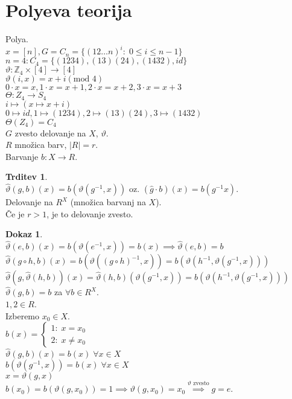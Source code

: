 \documentclass[a4paper, 12pt]{book}
\theoremstyle{definition}
\newtheorem{claim}[counter]{Trditev}
\newtheorem{pro}[counter]{Dokaz}
\theoremstyle{remark}
\newcommand{\Z}{\mathbb{Z}}
\begin{document}
\section{Polyeva teorija}

Polya. \\
$x = [n], G = C_n = \{(1 2 \dots n)^i: \; 0 \leq i \leq n-1\}$ \\
$n = 4: C_4 = \{(1 2 3 4), (1 3) (2 4), (1 4 3 2), id\}$ \\
$\vartheta: \Z_4 \times [4] \to [4]$ \\
$\vartheta(i, x) = x + i (\text{mod } 4)$ \\
$0 \cdot x = x, 1 \cdot x = x+1, 2 \cdot x = x+2, 3 \cdot x = x+3$ \\
$\Theta: Z_4 \to S_4$ \\
$i \mapsto (x \mapsto x+i)$ \\
$0 \mapsto id, 1 \mapsto (1 2 3 4), 2 \mapsto (1 3) (2 4), 3 \mapsto (1 4 3 2)$ \\
$\Theta(Z_4) = C_4$ \\
$G$ zvesto delovanje na $X$, $\vartheta$. \\
$R$ množica barv, $|R| = r$. \\
Barvanje $b: X \to R$.
\begin{claim} \text{} \\
  $\widehat{\vartheta}(g,b)(x) = b(\vartheta(g^{-1}, x))$ oz. $(\hat{g} \cdot b)(x) = b(g^{-1} x)$. \\
  Delovanje na $R^X$ (množica barvanj na $X$). \\
  Če je $r > 1$, je to delovanje zvesto. \\
\end{claim}
\begin{pro} \text{} \\
  $\widehat{\vartheta}(e,b)(x) = b(\vartheta(e^{-1},x)) = b(x) \implies \widehat{\vartheta}(e,b) = b$ \\
  $\widehat{\vartheta}(g \circ h, b)(x) = b(\vartheta((g \circ h)^{-1}, x)) = b(\vartheta(h^{-1}, \vartheta(g^{-1}, x)))$ \\
  $\widehat{\vartheta}(g, \widehat{\vartheta}(h, b))(x) = \widehat{\vartheta}(h, b)(\vartheta(g^{-1}, x)) =
  b(\vartheta(h^{-1}, \vartheta(g^{-1}, x)))$ \\
  $\widehat{\vartheta}(g, b) = b$ za $\forall b \in R^X$. \\
  $1, 2 \in R$. \\
  Izberemo $x_0 \in X$. \\
  $b(x) = \begin{cases}
    1: \; x = x_0 \\
    2: \; x \neq x_0
  \end{cases}$ \\
  $\widehat{\vartheta}(g, b)(x) = b(x) \; \forall x \in X$ \\
  $b(\vartheta(g^{-1}, x)) = b(x) \; \forall x \in X$ \\
  $x = \vartheta(g, x)$ \\
  $b(x_0) = b(\vartheta(g, x_0)) = 1 \implies \vartheta(g, x_0) = x_0 \stackrel{\vartheta \text{ zvesto}}{\implies} g = e$.
\end{pro}
\end{document}
